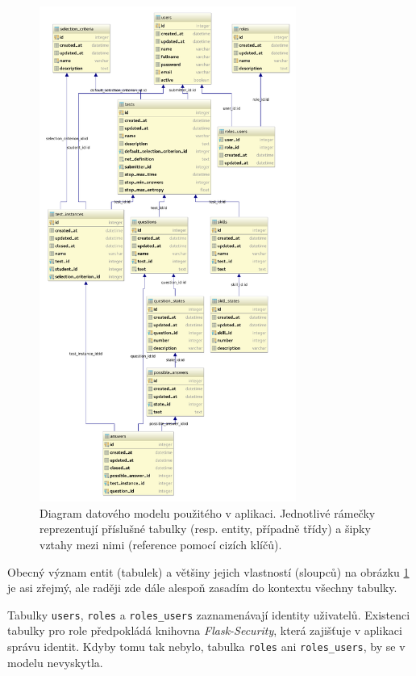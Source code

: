 \documentclass[a4paper,twoside,12pt]{scrbook}
\begin{document}
\begin{figure}
  \centering
    \includegraphics[width=0.75\textwidth]{data_model.pdf}
  \caption{Diagram datového modelu použitého v aplikaci. Jednotlivé rámečky reprezentují příslušné tabulky (resp. entity, případně třídy) a šipky vztahy mezi nimi (reference pomocí cizích klíčů).}
  \label{fig:data_model}
\end{figure}

Obecný význam entit (tabulek) a většiny jejich vlastností (sloupců) na obrázku \ref{fig:data_model} je asi zřejmý, ale raději zde dále alespoň zasadím do kontextu všechny tabulky.

Tabulky \texttt{users}, \texttt{roles} a \texttt{roles\_users} zaznamenávají identity uživatelů. Existenci tabulky pro role předpokládá knihovna \textit{Flask-Security}, která zajišťuje v aplikaci správu identit. Kdyby tomu tak nebylo, tabulka \texttt{roles} ani \texttt{roles\_users}, by se v modelu nevyskytla. \cite{Flask-Security}
\end{document}
